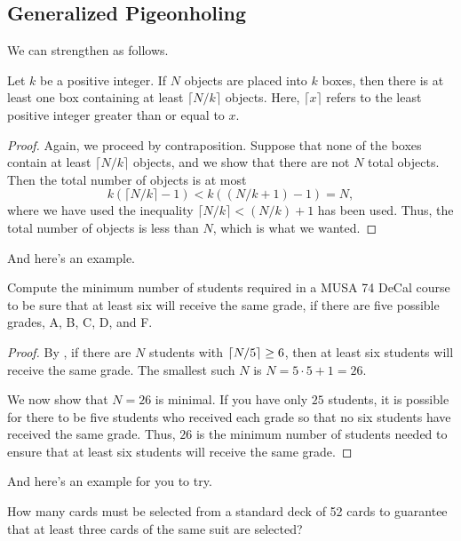 \documentclass[../main.tex]{subfiles}
\begin{document}

\subsection{Generalized Pigeonholing}
We can strengthen  as follows.
\begin{theorem} \label{thm:gen-pigeonhole}
    Let $k$ be a positive integer. If $N$ objects are placed into $k$ boxes, then there is at least one box containing at least $ \lceil N/k \rceil $ objects. Here, $\lceil x\rceil$ refers to the least positive integer greater than or equal to $x$.
\end{theorem}
\begin{proof}
    Again, we proceed by contraposition. Suppose that none of the boxes contain at least $\lceil N/k \rceil{}$ objects, and we show that there are not $N$ total objects. Then the total number of objects is at most
    \[k(\lceil N/k \rceil -1) < k((N/k + 1) - 1) = N,\]
    where we have used the inequality $\lceil N/k \rceil < (N/k) + 1$ has been used. Thus, the total number of objects is less than $N$, which is what we wanted.
\end{proof}
And here's an example.
\begin{exe}
    Compute the minimum number of students required in a MUSA 74 DeCal course to be sure that at least six will receive the same grade, if there are five possible grades, A, B, C, D, and F.
\end{exe}
\begin{proof}
    By , if there are $N$ students with $\left\lceil{N/5}\right\rceil\ge6$, then at least six students will receive the same grade. The smallest such $N$ is $N=5\cdot 5+1=26$.
    
    We now show that $N=26$ is minimal. If you have only $25$ students, it is possible for there to be five students who received each grade so that no six students have received the same grade. Thus, $26$ is the
    minimum number of students needed to ensure that at least six students will receive the same
    grade. 
\end{proof}
And here's an example for you to try.
\begin{exe}
    How many cards must be selected from a standard deck of 52 cards to guarantee that at least three cards of the same suit are selected?
\end{exe}
\end{document}

